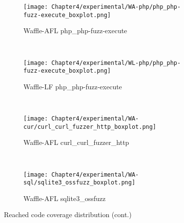 \begin{figure}[!t]\ContinuedFloat
    \begin{adjustbox}{center,max width=1.3\textwidth}
        \begin{subfigure}[t]{0.5\textwidth}
            \centering
            \texttt{[image: Chapter4/experimental/WA-php/php\_php-fuzz-execute\_boxplot.png]}
            \vspace*{-5mm}
            \caption{Waffle-AFL php\_php-fuzz-execute}
            \label{box:wap}
            \vspace*{5mm}
        \end{subfigure}
        ~
        \begin{subfigure}[t]{0.5\textwidth}
            \centering
            \texttt{[image: Chapter4/experimental/WL-php/php\_php-fuzz-execute\_boxplot.png]}
            \vspace*{-5mm}
            \caption{Waffle-LF php\_php-fuzz-execute}
            \label{box:wlp}
            \vspace*{5mm}
        \end{subfigure}
    \end{adjustbox}
    ~
    \begin{adjustbox}{center,max width=1.3\textwidth}
        
        \begin{subfigure}[t]{0.5\textwidth}
            \centering
            \texttt{[image: Chapter4/experimental/WA-cur/curl\_curl\_fuzzer\_http\_boxplot.png]}
            \vspace*{-5mm}
            \caption{Waffle-AFL curl\_curl\_fuzzer\_http}
            \label{box:wac}
            \vspace*{5mm}
        \end{subfigure}
        ~
        \begin{subfigure}[t]{0.5\textwidth}
            \centering
            \texttt{[image: Chapter4/experimental/WA-sql/sqlite3\_ossfuzz\_boxplot.png]}
            \vspace*{-5mm}
            \caption{Waffle-AFL sqlite3\_ossfuzz}
            \label{box:was}
            \vspace*{5mm}
        \end{subfigure}
    \end{adjustbox}
    \caption{Reached code coverage distribution (cont.)}
    \label{fig:report-box}
\end{figure}

